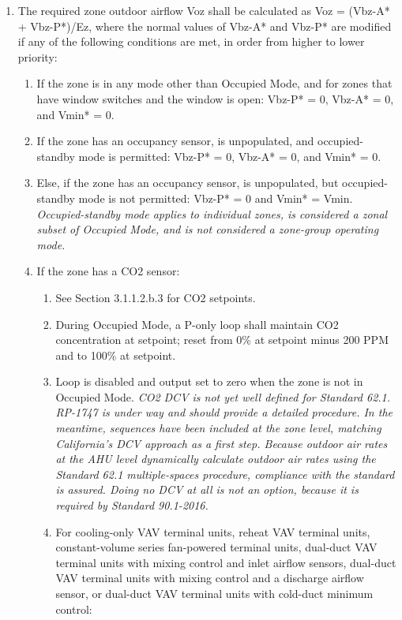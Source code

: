 \documentclass[10pt]{article}
\begin{document}
\begin{enumerate}
    \item The required zone outdoor airflow Voz shall be calculated as Voz = (Vbz-A* + Vbz-P*)/Ez, where the normal values of Vbz-A* and Vbz-P* are modified if any of the following conditions are met, in order from higher to lower priority:
    \begin{enumerate}
      \item If the zone is in any mode other than Occupied Mode, and for zones that have window switches and the window is open: Vbz-P* = 0, Vbz-A* = 0, and Vmin* = 0.
      \item If the zone has an occupancy sensor, is unpopulated, and occupied-standby mode is permitted: Vbz-P* = 0, Vbz-A* = 0, and Vmin* = 0.
      \item Else, if the zone has an occupancy sensor, is unpopulated, but occupied-standby mode is not permitted: Vbz-P* = 0 and Vmin* = Vmin.
      \textit{Occupied-standby mode applies to individual zones, is considered a zonal subset of Occupied Mode, and is not considered a zone-group operating mode.}
      \item If the zone has a CO2 sensor:
      \begin{enumerate}
        \item See Section 3.1.1.2.b.3 for CO2 setpoints.
        \item During Occupied Mode, a P-only loop shall maintain CO2 concentration at setpoint; reset from 0\% at setpoint minus 200 PPM and to 100\% at setpoint. 
        \item Loop is disabled and output set to zero when the zone is not in Occupied Mode.
        \textit{CO2 DCV is not yet well defined for Standard 62.1. RP-1747 is under way and should provide a detailed procedure. In the meantime, sequences have been included at the zone level, matching California’s DCV approach as a first step. Because outdoor air rates at the AHU level dynamically calculate outdoor air rates using the Standard 62.1 multiple-spaces procedure, compliance with the standard is assured. Doing no DCV at all is not an option, because it is required by Standard 90.1-2016.}
        \item For cooling-only VAV terminal units, reheat VAV terminal units, constant-volume series fan-powered terminal units, dual-duct VAV terminal units with mixing control and inlet airflow sensors, dual-duct VAV terminal units with mixing control and a discharge airflow sensor, or dual-duct VAV terminal units with cold-duct minimum control:
        \begin{enumerate}

\end{enumerate}
\end{enumerate}
\end{enumerate}
\end{enumerate}
\end{document}
